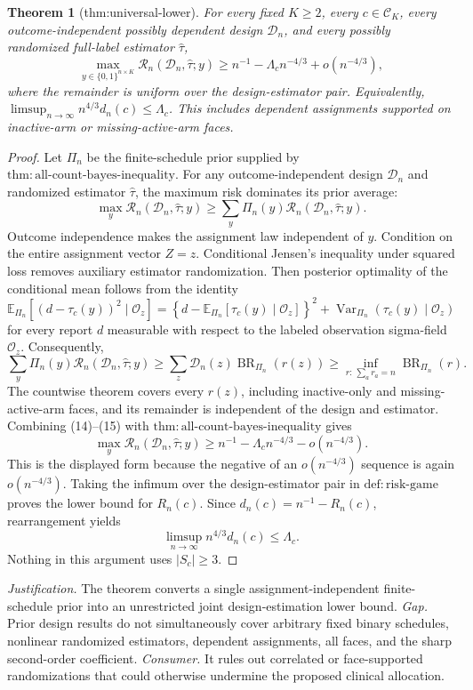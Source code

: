 \documentclass{article}
\newtheorem{theorem}{Theorem}
\begin{document}
\begin{theorem}[thm:universal-lower]\label{thm:universal-lower}
For every fixed \(K\ge2\), every \(c\in\mathcal C_K\), every outcome-independent possibly dependent design \(\mathcal D_n\), and every possibly randomized full-label estimator \(\widehat\tau\),
\[
\max_{y\in\{0,1\}^{n\times K}}\mathcal R_n(\mathcal D_n,\widehat\tau;y)
\ge n^{-1}-\Lambda_cn^{-4/3}+o(n^{-4/3}),
\]
where the remainder is uniform over the design-estimator pair. Equivalently, \(\limsup_{n\to\infty}n^{4/3}d_n(c)\le\Lambda_c\).  This includes dependent assignments supported on inactive-arm or missing-active-arm faces.
\end{theorem}
\begin{proof}
Let \(\Pi_n\) be the finite-schedule prior supplied by
\(\mathrm{thm:all\text{-}count\text{-}bayes\text{-}inequality}\).
For any outcome-independent design \(\mathcal D_n\) and randomized estimator
\(\widehat\tau\), the maximum risk dominates its prior average:
\[
\max_y\mathcal R_n(\mathcal D_n,\widehat\tau;y)
\ge\sum_y\Pi_n(y)\mathcal R_n(\mathcal D_n,\widehat\tau;y).
\tag{14}
\]
Outcome independence makes the assignment law independent of \(y\).  Condition on the entire assignment vector \(Z=z\).  Conditional Jensen's inequality under squared loss removes auxiliary estimator randomization.  Then posterior optimality of the conditional mean follows from the identity
\[
\mathbb E_{\Pi_n}\!\left[(d-\tau_c(y))^2\mid\mathscr O_z\right]
=\left\{d-\mathbb E_{\Pi_n}[\tau_c(y)\mid\mathscr O_z]\right\}^2
+\operatorname{Var}_{\Pi_n}(\tau_c(y)\mid\mathscr O_z)
\]
for every report \(d\) measurable with respect to the labeled observation sigma-field \(\mathscr O_z\).  Consequently,
\[
\sum_y\Pi_n(y)\mathcal R_n(\mathcal D_n,\widehat\tau;y)
\ge\sum_z\mathcal D_n(z)\operatorname{BR}_{\Pi_n}(r(z))
\ge\inf_{r:\,\sum_ar_a=n}\operatorname{BR}_{\Pi_n}(r).
\tag{15}
\]
The countwise theorem covers every \(r(z)\), including inactive-only and missing-active-arm faces, and its remainder is independent of the design and estimator.  Combining (14)--(15) with
\(\mathrm{thm:all\text{-}count\text{-}bayes\text{-}inequality}\) gives
\[
\max_y\mathcal R_n(\mathcal D_n,\widehat\tau;y)
\ge n^{-1}-\Lambda_cn^{-4/3}-o(n^{-4/3}).
\]
This is the displayed form because the negative of an \(o(n^{-4/3})\) sequence is again \(o(n^{-4/3})\).  Taking the infimum over the design-estimator pair in
\(\mathrm{def:risk\text{-}game}\) proves the lower bound for \(R_n(c)\).  Since
\(d_n(c)=n^{-1}-R_n(c)\), rearrangement yields
\[
\limsup_{n\to\infty}n^{4/3}d_n(c)\le\Lambda_c.
\]
Nothing in this argument uses \(|S_c|\ge3\).
\end{proof}
\par\smallskip\noindent \textit{Justification.} The theorem converts a single assignment-independent finite-schedule prior into an unrestricted joint design-estimation lower bound. \textit{Gap.} Prior design results do not simultaneously cover arbitrary fixed binary schedules, nonlinear randomized estimators, dependent assignments, all faces, and the sharp second-order coefficient. \textit{Consumer.} It rules out correlated or face-supported randomizations that could otherwise undermine the proposed clinical allocation.
\end{document}
